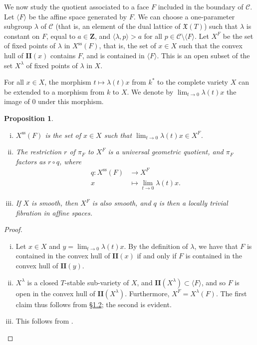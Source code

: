 \documentclass{article}
\theoremstyle{plain}
\newtheorem*{proposition}{Proposition}
\theoremstyle{definition}
\newcommand{\ZZ}{\mathbf{Z}}
\renewcommand{\ss}{\mathrm{ss}}
\newcommand{\II}{\mathbf{II}}
\newcommand{\oldpage}[1]{\marginpar{\footnotesize$\Big\vert$ \textit{p.~#1}}}
\begin{document}
We now study the quotient associated to a face $F$ included in the boundary of $\mathcal{C}$.
Let $\langle F\rangle$ be the affine space generated by $F$.
We can choose a one-parameter subgroup $\lambda$ of $\mathcal{C}$ (that is, an element of the dual lattice of $\mathfrak{X}(T)$) such that $\lambda$ is constant on $F$, equal to $a\in\ZZ$, and $\langle\lambda,p\rangle>a$ for all $p\in\mathcal{C}\setminus\langle F\rangle$.
Let $X^F$ be the set of fixed points of $\lambda$ in $X^\ss(F)$, that is, the set of $x\in X$ such that the convex hull of $\II(x)$ contains $F$, and is contained in $\langle F\rangle$.
This is an open subset of the set $X^\lambda$ of fixed points of $\lambda$ in $X$.

For all $x\in X$, the morphism $t\mapsto\lambda(t)x$ from $k^*$ to the complete variety $X$ can be extended to a morphism from $k$ to $X$.
We denote by $\lim_{t\to0}\lambda(t)x$ the image of $0$ under this morphism.

\begin{proposition}
  \begin{enumerate}[(i)]
    \item $X^\ss(F)$ is the set of $x\in X$ such that $\lim_{t\to0}\lambda(t)x\in X^F$.
    \item The restriction $r$ of $\pi_F$ to $X^F$ is a universal geometric quotient, and $\pi_F$ factors as $r\circ q$, where
      \[
        \begin{aligned}
          q\colon X^\ss(F) &\to X^F
        \\x &\mapsto \lim_{t\to0}\lambda(t)x.
        \end{aligned}
      \]
    \item If $X$ is smooth, then $X^F$ is also smooth, and $q$ is then a locally trivial fibration in affine spaces.
  \end{enumerate}
\end{proposition}

\begin{proof}
  \begin{enumerate}[(i)]
    \item Let $x\in X$ and $y=\lim_{t\to0}\lambda(t)x$.
      By the definition of $\lambda$, we have that
\oldpage{516}
      $F$ is contained in the convex hull of $\II(x)$ if and only if $F$ is contained in the convex hull of $\II(y)$.
    \item $X^\lambda$ is a closed $T$-stable sub-variety of $X$, and $\II(X^\lambda)\subset\langle F\rangle$, and so $F$ is open in the convex hull of $\II(X^\lambda)$.
      Furthermore, $X^F=X^\lambda(F)$.
      The first claim thus follows from \hyperref[1.2]{\S1.2};
      the second is evident.
    \item This follows from \cite[Theorem~4.4.]{BB}.
  \end{enumerate}
\end{proof}
\end{document}
